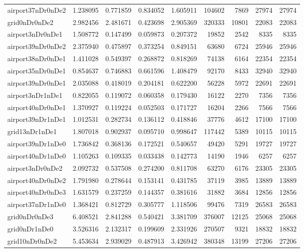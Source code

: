 \begin{longtable}{|l|r|r|r|r|r|r|r|r|}
airport37nDr0nDe2 & 1.238095 & 0.771859 & 0.834052 & 1.605911 & 104602 & 7869 & 27974 & 27974 \\
grid0nDr0nDe2 & 2.982456 & 2.481671 & 0.423698 & 2.905369 & 320333 & 10801 & 22083 & 22083 \\
airport3nDr0nDe1 & 1.508772 & 0.147499 & 0.059873 & 0.207372 & 19852 & 2542 & 8335 & 8335 \\
airport39nDr0nDe2 & 2.375940 & 0.475897 & 0.373254 & 0.849151 & 63680 & 6724 & 25946 & 25946 \\
airport38nDr0nDe1 & 1.411028 & 0.549397 & 0.268872 & 0.818269 & 74138 & 6164 & 22354 & 22354 \\
airport35nDr0nDe1 & 0.854637 & 0.746883 & 0.661596 & 1.408479 & 92170 & 8433 & 32940 & 32940 \\
airport39nDr0nDe1 & 2.035088 & 0.418019 & 0.204181 & 0.622200 & 56228 & 5972 & 22691 & 22691 \\
airport3nDr1nDe1 & 0.822055 & 0.119072 & 0.060358 & 0.179430 & 16122 & 2270 & 7356 & 7356 \\
airport40nDr0nDe1 & 1.370927 & 0.119224 & 0.052503 & 0.171727 & 16204 & 2266 & 7566 & 7566 \\
airport39nDr1nDe1 & 1.012531 & 0.282734 & 0.136112 & 0.418846 & 37776 & 4612 & 17100 & 17100 \\
grid13nDr1nDe1 & 1.807018 & 0.902937 & 0.095710 & 0.998647 & 117442 & 5389 & 10115 & 10115 \\
airport39nDr1nDe0 & 1.736842 & 0.368136 & 0.172521 & 0.540657 & 49420 & 5291 & 19727 & 19727 \\
airport40nDr1nDe0 & 1.105263 & 0.109335 & 0.033438 & 0.142773 & 14190 & 1946 & 6257 & 6257 \\
airport3nDr0nDe2 & 2.092732 & 0.537508 & 0.274200 & 0.811708 & 63270 & 6176 & 23305 & 23305 \\
airport40nDr0nDe2 & 1.791980 & 0.278644 & 0.153141 & 0.431785 & 37119 & 3985 & 13889 & 13889 \\
airport40nDr0nDe3 & 1.631579 & 0.237259 & 0.144357 & 0.381616 & 31882 & 3684 & 12856 & 12856 \\
airport37nDr1nDe0 & 1.368421 & 0.812729 & 0.305777 & 1.118506 & 99476 & 7319 & 26583 & 26583 \\
grid0nDr0nDe3 & 6.408521 & 2.841288 & 0.540421 & 3.381709 & 376007 & 12125 & 25068 & 25068 \\
grid0nDr1nDe0 & 3.526316 & 2.132317 & 0.199609 & 2.331926 & 270507 & 9321 & 18832 & 18832 \\
grid10nDr0nDe2 & 5.453634 & 2.939029 & 0.487913 & 3.426942 & 380348 & 13199 & 27206 & 27206 \\

\end{longtable}
